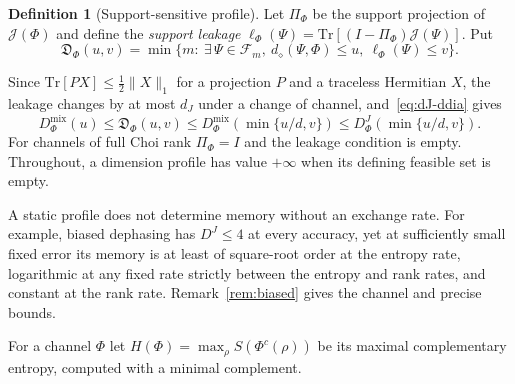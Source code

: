 \documentclass[11pt,a4paper]{article}
\theoremstyle{plain}
\theoremstyle{definition}
\newtheorem{definition}[theorem]{Definition}
\theoremstyle{remark}
\newcommand{\Dmix}{D^{\mathrm{mix}}}
\newcommand{\DChoi}{D^{J}}
\newcommand{\dJ}{d_J}
\newcommand{\ddia}{d_\diamond}
\newcommand{\Dsupp}{\mathfrak{D}}
\begin{document}
\begin{definition}[Support-sensitive profile]\label{def:support-profile}
Let $\Pi_\Phi$ be the support projection of $\mathcal J(\Phi)$ and define the \emph{support leakage}
$\ell_\Phi(\Psi)=\mathrm{Tr}[(I-\Pi_\Phi)\mathcal J(\Psi)]$. Put
\[
\Dsupp_\Phi(u,v)=\min\{m:\ \exists\,\Psi\in\mathcal F_m,\ \ddia(\Psi,\Phi)\le u,\ \ell_\Phi(\Psi)\le v\}.
\]
\end{definition}

Since $\mathrm{Tr}[PX]\le\frac12\|X\|_1$ for a projection $P$ and a traceless Hermitian $X$, the leakage changes by at
most $\dJ$ under a change of channel, and~\eqref{eq:dJ-ddia} gives
\begin{equation}\label{eq:profile-sandwich}
\Dmix_\Phi(u)\le\Dsupp_\Phi(u,v)\le\Dmix_\Phi(\min\{u/d,v\})\le\DChoi_\Phi(\min\{u/d,v\}).
\end{equation}
For channels of full Choi rank $\Pi_\Phi=I$ and the leakage condition is empty.
Throughout, a dimension profile has value $+\infty$ when its defining feasible set is empty.

A static profile does not determine memory without an exchange rate. For example, biased dephasing has $\DChoi\le4$ at every accuracy,
yet at sufficiently small fixed error its memory is at least of square-root order at the entropy rate, logarithmic at any fixed rate
strictly between the entropy and rank rates, and constant at the rank rate. Remark~\ref{rem:biased} gives the channel and precise bounds.

For a channel $\Phi$ let $H(\Phi)=\max_\rho S(\Phi^c(\rho))$ be its maximal complementary entropy, computed with a
minimal complement.
\end{document}
